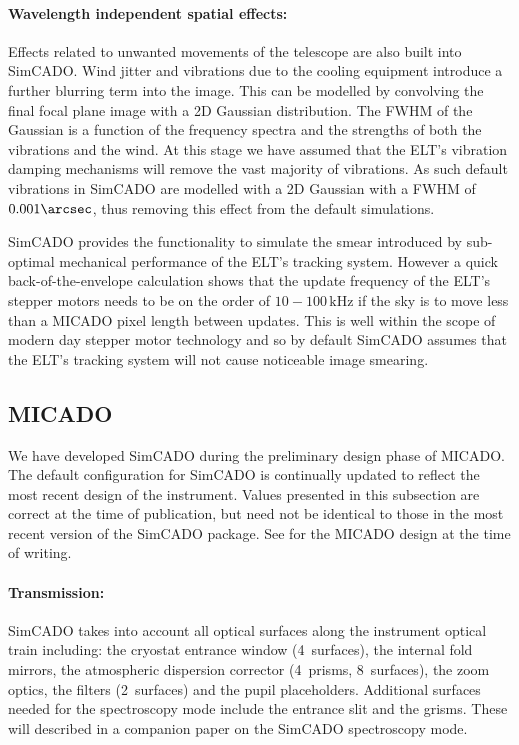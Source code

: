\paragraph{Wavelength independent spatial effects:} Effects related to unwanted movements of the telescope are also built into SimCADO. Wind jitter and vibrations due to the cooling equipment introduce a further blurring term into the image. This can be modelled by convolving the final focal plane image with a 2D Gaussian distribution. The FWHM of the Gaussian is a function of the frequency spectra and the strengths of both the vibrations and the wind. At this stage we have assumed that the ELT's vibration damping mechanisms will remove the vast majority of vibrations. As such default vibrations in SimCADO are modelled with a 2D Gaussian with a FWHM of $0.001\arcsec$, thus removing this effect from the default simulations.

SimCADO provides the functionality to simulate the smear introduced by sub-optimal mechanical performance of the ELT's tracking system. However a quick back-of-the-envelope calculation shows that the update frequency of the ELT's stepper motors needs to be on the order of $10-100\,\mathrm{kHz}$ if the sky is to move less than a MICADO pixel length between updates. This is well within the scope of modern day stepper motor technology and so by default SimCADO assumes that the ELT's tracking system will not cause noticeable image smearing. 


\subsection{MICADO}
\label{ssec:MICADO}
We have developed SimCADO during the preliminary design phase of MICADO. The default configuration for SimCADO is continually updated to reflect the most recent design of the instrument. Values presented in this subsection are correct at the time of publication, but need not be identical to those in the most recent version of the SimCADO package. See \citet{micado2016} for the MICADO design at the time of writing.

\paragraph{Transmission:} SimCADO takes into account all optical surfaces along the instrument optical train including: the cryostat entrance window (4~surfaces), the internal fold mirrors, the atmospheric dispersion corrector (4~prisms, 8~surfaces), the zoom optics, the filters (2~surfaces) and the pupil placeholders. Additional surfaces needed for the spectroscopy mode include the entrance slit and the grisms. These will described in a companion paper on the SimCADO spectroscopy mode. 

